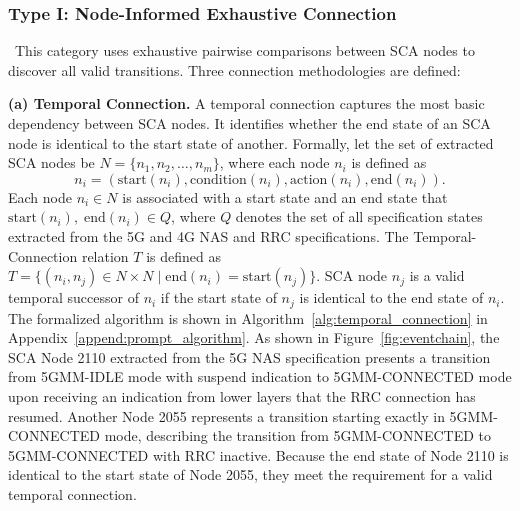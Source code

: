 \subsubsection{Type I: Node-Informed Exhaustive Connection}
~This category uses exhaustive pairwise comparisons between SCA nodes to discover all valid transitions. Three connection methodologies are defined:


\noindent \textbf{(a) Temporal Connection.} 
A temporal connection captures the most basic dependency between SCA nodes. It identifies whether the end state of an SCA node is identical to the start state of another. Formally, let the set of extracted SCA nodes be $N = \{n_1, n_2, \ldots, n_m \}$, where each node $n_i$ is defined as   
\[
n_i = (\text{start}(n_i), \text{condition}(n_i), \text{action}(n_i), \text{end}(n_i)).
\]
\noindent Each node $n_i \in N$ is associated with a start state and an end state that $\text{start}(n_i), \; \text{end}(n_i) \in Q$, where $Q$ denotes the set of all specification states extracted from the 5G and 4G NAS and RRC specifications. 
The Temporal-Connection relation \( T \) is defined as 
\(T = \{ (n_i, n_j) \in N \times N \mid \text{end}(n_i) = \text{start}(n_j) \} \). 
SCA node \(n_j\) is a valid temporal successor of \(n_i\) if the start state of \(n_j\) is identical to the end state of \(n_i\). 
The formalized algorithm is shown in Algorithm~\ref{alg:temporal_connection} in Appendix~\ref{append:prompt_algorithm}.
As shown in Figure~\ref{fig:eventchain}, the SCA Node 2110 extracted from the 5G NAS specification presents a transition from 5GMM-IDLE mode with suspend indication to 5GMM-CONNECTED mode upon receiving an indication from lower layers that the RRC connection has resumed. Another Node 2055 represents a transition starting exactly in 5GMM-CONNECTED mode, describing the transition from 5GMM-CONNECTED to 5GMM-CONNECTED with RRC inactive. Because the end state of Node 2110 is identical to the start state of Node 2055, they meet the requirement for a valid temporal connection. 

